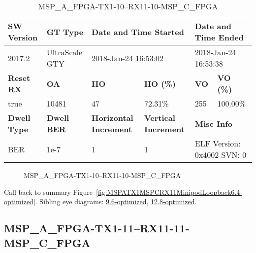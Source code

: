 \begin{table}[h]
\centering
\caption{MSP\_A\_FPGA-TX1-10--RX11-10-MSP\_C\_FPGA}
\label{tab:MSPAFPGATX110RX1110MSPCFPGA6.4-optimized}
\begin{tabular}{@{}|l|l|l|l|l|l|@{}}
\toprule
\textbf{SW Version}                & \textbf{GT Type}   & \multicolumn{2}{l|}{\textbf{Date and Time Started}}            & \multicolumn{2}{l|}{\textbf{Date and Time Ended}}        \\ \midrule
2017.2                       & UltraScale GTY          & \multicolumn{2}{l|}{2018-Jan-24 16:53:02}                   & \multicolumn{2}{l|}{2018-Jan-24 16:53:38}               \\ \midrule
\textbf{Reset RX}                  & \textbf{OA} & \textbf{HO}   & \textbf{HO (\%)} & \textbf{VO} & \textbf{VO (\%)} \\ \midrule
true & 10481        & 47          & 72.31\%        & 255        & 100.00\%       \\ \midrule
\textbf{Dwell Type}                & \textbf{Dwell BER} & \textbf{Horizontal Increment} & \textbf{Vertical Increment}    & \multicolumn{2}{l|}{\textbf{Misc Info}}                  \\ \midrule
BER                            & 1e-7        & 1        & 1           & \multicolumn{2}{l|}{ELF Version: 0x4002 SVN: 0}                         \\ \bottomrule
\end{tabular}
\end{table}

\begin{figure}[h]
\caption{MSP\_A\_FPGA-TX1-10--RX11-10-MSP\_C\_FPGA} \label{fig:MSPAFPGATX110RX1110MSPCFPGA6.4-optimized}
\end{figure}

Call back to summary Figure~\ref{fig:MSPATX1MSPCRX11MinipodLoopback6.4-optimized}.
Sibling eye diagrams: \hyperref[sec:MSPAFPGATX110RX1110MSPCFPGA9.6-optimized]{9.6-optimized}, \hyperref[sec:MSPAFPGATX110RX1110MSPCFPGA12.8-optimized]{12.8-optimized}.

\clearpage
\newpage


\subsection{MSP\_A\_FPGA-TX1-11--RX11-11-MSP\_C\_FPGA}\label{sec:MSPAFPGATX111RX1111MSPCFPGA6.4-optimized}

